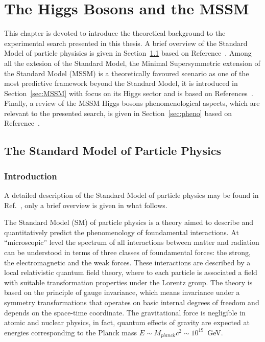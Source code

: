 
\chapter{The Higgs Bosons and the MSSM}

 \vspace{2cm}

This chapter is devoted to introduce the theoretical background to the experimental search presented in this thesis.
A brief overview of the Standard Model of particle physisics is given in Section~\ref{sec:SM} based on Reference~\cite{Altarelli}. 
Among all the extesion of the Standard Model, the Minimal Supersymmetric 
extension of the Standard Model (MSSM) is a theoretically favoured scenario as one of the most predictive
framework beyond the Standard Model, it is introduced in Section~\ref{sec:MSSM} with focus on its Higgs sector and is based on 
References~\cite{SusyPrimer,Djuadi}.
Finally, a review of the MSSM Higgs bosons phenomenological aspects, which are relevant to the presented search, is given 
in Section~\ref{sec:pheno} based on Reference~\cite{LHCxsec}.

\restoregeometry

\clearpage

\section{The Standard Model of Particle Physics} \label{sec:SM}
\subsection{Introduction}
A detailed description of the Standard Model of particle physics may be found in Ref.~\cite{Peskin}, only a brief overview is
given in what follows.

The Standard Model (SM) of particle physics is a theory aimed to describe and quantitatively predict
the phenomenology of foundamental interactions. At ``microscopic''  level the spectrum of all interactions between matter and 
radiation can be understood in terms of three classes of foundamental forces: the strong, the electromagnetic
and the weak forces. These interactions are described by a local relativistic quantum field theory, where to each particle
is associated a field with suitable transformation properties under the Lorentz group.
The theory is based on the principle of gauge invariance, which means invariance under  a symmetry  transformations    
that operates on basic internal degrees of freedom and depends on the space-time coordinate.
The gravitational force is negligible in atomic and nuclear physics, in fact,
quantum effects of gravity are expected at energies corresponding to the Planck mass $E \sim M_{planck} c^2 \sim 10^{19}$~GeV.

